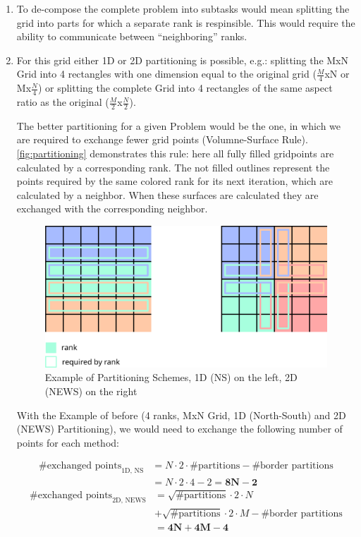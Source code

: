 \documentclass[]{scrartcl}
\begin{document}
\begin{enumerate}
    \item To de-compose the complete problem into subtasks would mean splitting the grid into parts for which a separate rank is respinsible.
        This would require the ability to communicate between ``neighboring'' ranks.
    \item For this grid either 1D or 2D partitioning is possible, e.g.: splitting the MxN Grid into 4 rectangles with one dimension equal to the original grid ($\frac M4$xN or Mx$\frac N4$) or splitting the complete Grid into 4 rectangles of the same aspect ratio as the original ($\frac M2$x$\frac N2$).

    The better partitioning for a given Problem would be the one, in which we are required to exchange fewer grid points (Volumne-Surface Rule).
    \autoref{fig:partitioning} demonstrates this rule: here all fully filled gridpoints are calculated by a corresponding rank.
    The not filled outlines represent the points required by the same colored rank for its next iteration, which are calculated by a neighbor.
    When these surfaces are calculated they are exchanged with the corresponding neighbor.

    \begin{figure}[H]
        \centering
        \includegraphics[width=0.8\linewidth]{img/partitioning.png}
        \caption{Example of Partitioning Schemes, 1D (NS) on the left, 2D (NEWS) on the right}%
        \label{fig:partitioning}
    \end{figure}

    With the Example of before (4 ranks, MxN Grid, 1D (North-South) and 2D (NEWS) Partitioning), we would need to exchange the following number of points for each method:

    \begin{align}
        \text{\# exchanged points}_\text{1D, NS} &= N \cdot 2 \cdot \text{\# partitions} - \text{\# border partitions}\\
                                                    &= N\cdot 2 \cdot 4 - 2 = \mathbf{8N-2}
    \end{align}
    \begin{align}
        \text{\# exchanged points}_\text{2D, NEWS} &= \sqrt{\text{\# partitions}} \cdot 2 \cdot N \nonumber\\
                                                      &+ \sqrt{\text{\# partitions}} \cdot 2 \cdot M - \text{\# border partitions}\\
                                                      &= \mathbf{4N + 4M - 4}
    \end{align}


\end{enumerate}
\end{document}
